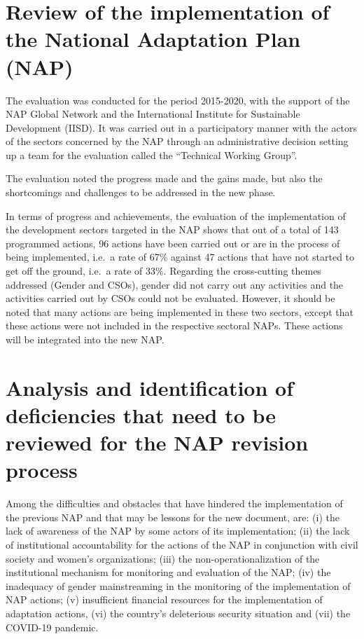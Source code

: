 \documentclass[
]{book}
\begin{document}
\section{Review of the implementation of the National Adaptation Plan (NAP)}\label{review-of-the-implementation-of-the-national-adaptation-plan-nap}

The evaluation was conducted for the period 2015-2020, with the support of the NAP Global Network and the International Institute for Sustainable Development (IISD). It was carried out in a participatory manner with the actors of the sectors concerned by the NAP through an administrative decision setting up a team for the evaluation called the ``Technical Working Group''.

The evaluation noted the progress made and the gains made, but also the shortcomings and challenges to be addressed in the new phase.

In terms of progress and achievements, the evaluation of the implementation of the development sectors targeted in the NAP shows that out of a total of 143 programmed actions, 96 actions have been carried out or are in the process of being implemented, i.e.~a rate of 67\% against 47 actions that have not started to get off the ground, i.e.~a rate of 33\%. Regarding the cross-cutting themes addressed (Gender and CSOs), gender did not carry out any activities and the activities carried out by CSOs could not be evaluated. However, it should be noted that many actions are being implemented in these two sectors, except that these actions were not included in the respective sectoral NAPs. These actions will be integrated into the new NAP.

\section{Analysis and identification of deficiencies that need to be reviewed for the NAP revision process}\label{analysis-and-identification-of-deficiencies-that-need-to-be-reviewed-for-the-nap-revision-process}

Among the difficulties and obstacles that have hindered the implementation of the previous NAP and that may be lessons for the new document, are: (i) the lack of awareness of the NAP by some actors of its implementation; (ii) the lack of institutional accountability for the actions of the NAP in conjunction with civil society and women's organizations; (iii) the non-operationalization of the institutional mechanism for monitoring and evaluation of the NAP; (iv) the inadequacy of gender mainstreaming in the monitoring of the implementation of NAP actions; (v) insufficient financial resources for the implementation of adaptation actions, (vi) the country's deleterious security situation and (vii) the COVID-19 pandemic.
\end{document}
